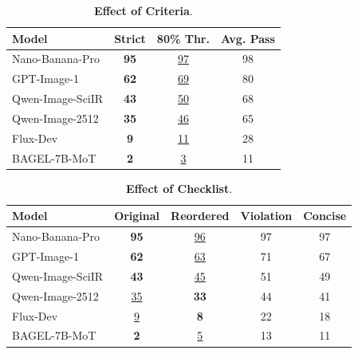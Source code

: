 \documentclass[runningheads]{llncs}
\begin{document}
\begin{table}[t]
\centering
\caption{\textbf{Effect of Criteria}.}
\label{tab:aggregation_sensitivity}

\small
\setlength{\tabcolsep}{7pt}
\renewcommand{\arraystretch}{1.15}

\begin{tabular}{lccc}
\toprule
\textbf{Model}
&
\textbf{Strict}
&
\textbf{80\% Thr.}
&
\textbf{Avg. Pass}
\\
\midrule
Nano-Banana-Pro
& \cellcolor{skyblue!35}\textbf{95}
& \underline{97}
& 98 \\

GPT-Image-1
& \cellcolor{skyblue!35}\textbf{62}
& \underline{69}
& 80 \\

Qwen-Image-SciIR
& \cellcolor{skyblue!35}\textbf{43}
& \underline{50}
& 68 \\

Qwen-Image-2512
& \cellcolor{skyblue!35}\textbf{35}
& \underline{46}
& 65 \\

Flux-Dev
& \cellcolor{skyblue!35}\textbf{9}
& \underline{11}
& 28 \\

BAGEL-7B-MoT
& \cellcolor{skyblue!35}\textbf{2}
& \underline{3}
& 11 \\
\bottomrule
\end{tabular}
\end{table}


\begin{table}[t]
\centering
\caption{\textbf{Effect of Checklist}.}
\label{tab:wording_sensitivity}

\small
\setlength{\tabcolsep}{5pt}
\renewcommand{\arraystretch}{1.15}

\begin{tabular}{lcccc}
\toprule
\textbf{Model}
&
\textbf{Original}
&
\textbf{Reordered}
&
\textbf{Violation}
&
\textbf{Concise}
\\
\midrule
Nano-Banana-Pro
& \cellcolor{skyblue!35}\textbf{95}
& \underline{96}
& 97
& 97 \\

GPT-Image-1
& \cellcolor{skyblue!35}\textbf{62}
& \underline{63}
& 71
& 67 \\

Qwen-Image-SciIR
& \cellcolor{skyblue!35}\textbf{43}
& \underline{45}
& 51
& 49 \\

Qwen-Image-2512
& \underline{35}
& \cellcolor{skyblue!35}\textbf{33}
& 44
& 41 \\

Flux-Dev
& \underline{9}
& \cellcolor{skyblue!35}\textbf{8}
& 22
& 18 \\

BAGEL-7B-MoT
& \cellcolor{skyblue!35}\textbf{2}
& \underline{5}
& 13
& 11 \\
\bottomrule
\end{tabular}
\end{table}
\end{document}
